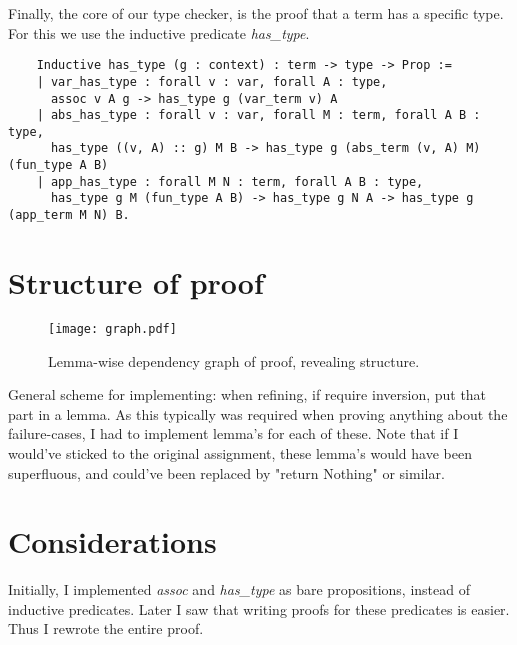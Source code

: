 \documentclass[a4paper, 10pt]{amsart}
\begin{document}
	Finally, the core of our type checker, is the proof that a term has a specific type.
	For this we use the inductive predicate \emph{has\_type}.
	\begin{lstlisting}
	Inductive has_type (g : context) : term -> type -> Prop :=
	| var_has_type : forall v : var, forall A : type,
	  assoc v A g -> has_type g (var_term v) A
	| abs_has_type : forall v : var, forall M : term, forall A B : type,
	  has_type ((v, A) :: g) M B -> has_type g (abs_term (v, A) M) (fun_type A B)
	| app_has_type : forall M N : term, forall A B : type,
	  has_type g M (fun_type A B) -> has_type g N A -> has_type g (app_term M N) B.
	\end{lstlisting}

	\section{Structure of proof}
	
	\begin{figure}[H]
		\texttt{[image: graph.pdf]}
		\caption{Lemma-wise dependency graph of proof, revealing structure.}
	\end{figure}
	
	General scheme for implementing: when refining, if require inversion, put that part in a lemma.
	As this typically was required when proving anything about the failure-cases, I had to implement lemma's for each of these.
	Note that if I would've sticked to the original assignment, these lemma's would have been superfluous, and could've been replaced by "return Nothing" or similar.

	\section{Considerations}

	Initially, I implemented \emph{assoc} and \emph{has\_type} as bare propositions, instead of inductive predicates.
	Later I saw that writing proofs for these predicates is easier.
	Thus I rewrote the entire proof.
\end{document}
